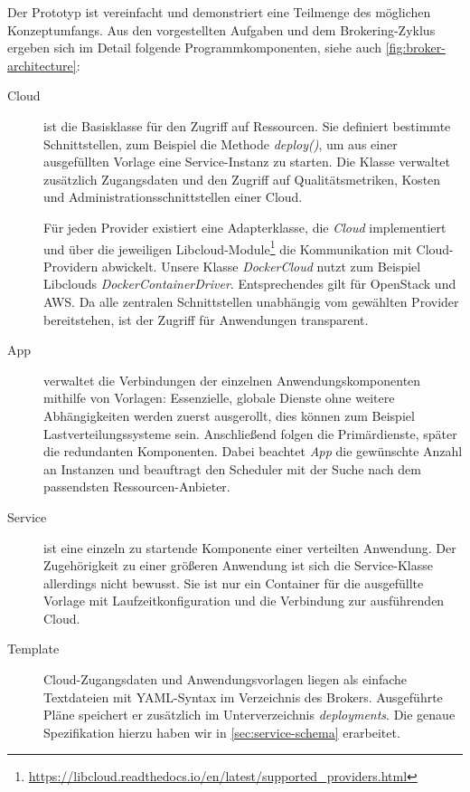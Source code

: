 \noindent
Der Prototyp ist vereinfacht und demonstriert eine Teilmenge des möglichen Konzeptumfangs. Aus den vorgestellten Aufgaben und dem Brokering-Zyklus ergeben sich im Detail folgende Programmkomponenten, siehe auch  \autoref{fig:broker-architecture}:

\begin{description}
	
	\item[Cloud] ist die Basisklasse für den Zugriff auf Ressourcen. Sie definiert bestimmte Schnittstellen, zum Beispiel die Methode \emph{deploy()}, um aus einer ausgefüllten Vorlage eine Service-Instanz zu starten. Die Klasse verwaltet zusätzlich Zugangsdaten und den Zugriff auf Qualitätsmetriken, Kosten und Administrationsschnittstellen einer Cloud.
	
	Für jeden Provider existiert eine Adapterklasse, die \emph{Cloud} implementiert und über die jeweiligen Libcloud-Module\footnote{\url{https://libcloud.readthedocs.io/en/latest/supported_providers.html}} die Kommunikation mit Cloud-Providern abwickelt. Unsere Klasse \emph{DockerCloud} nutzt zum Beispiel Libclouds \emph{DockerContainerDriver}. Entsprechendes gilt für OpenStack und AWS. Da alle zentralen Schnittstellen unabhängig vom gewählten Provider bereitstehen, ist der Zugriff für Anwendungen transparent.
	
	\item[App] verwaltet die Verbindungen der einzelnen Anwendungskomponenten mithilfe von Vorlagen: Essenzielle, globale Dienste ohne weitere Abhängigkeiten werden zuerst ausgerollt, dies können zum Beispiel Lastverteilungssysteme sein. Anschließend folgen die Primärdienste, später die redundanten Komponenten. Dabei beachtet \emph{App} die gewünschte Anzahl an Instanzen und beauftragt den Scheduler mit der Suche nach dem passendsten Ressourcen-Anbieter.
	
	\item[Service] ist eine einzeln zu startende Komponente einer verteilten Anwendung. Der Zugehörigkeit zu einer größeren Anwendung ist sich die Service-Klasse allerdings nicht bewusst. Sie ist nur ein Container für die ausgefüllte Vorlage mit Laufzeitkonfiguration und die Verbindung zur ausführenden Cloud.
	
	\item[Template] Cloud-Zugangsdaten und Anwendungsvorlagen liegen als einfache Textdateien mit YAML-Syntax im Verzeichnis des Brokers. Ausgeführte Pläne speichert er zusätzlich im Unterverzeichnis \emph{deployments}. Die genaue Spezifikation hierzu haben wir in \autoref{sec:service-schema} erarbeitet.
	

\end{description}
